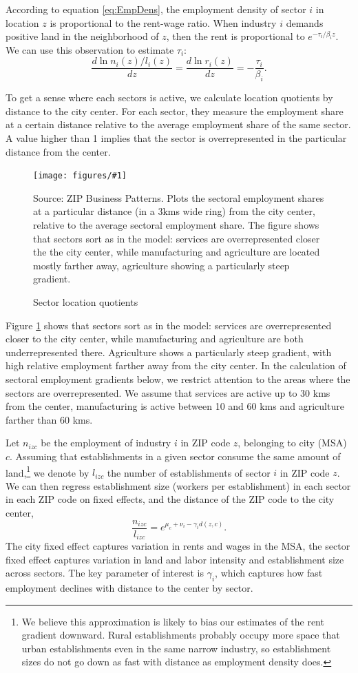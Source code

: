 \documentclass[12pt]{article}
\newcommand{\dofigure}[3]{\begin{figure}
\begin{centering}
\texttt{[image: figures/\#1]}
  \caption{#2\label{fig:#1}}
\end{centering}

\noindent \footnotesize{#3}
\end{figure}}
\begin{document}
According to equation \ref{eq:EmpDens}, the employment density of sector $i$ in location $z$ is proportional to the rent-wage ratio. When industry $i$ demands positive land in the neighborhood of $z$, then the rent is proportional to $e^{-\tau_i/\beta_i z}$. We can use this observation to estimate $\tau_i$:
\[
\frac{d\ln n_i(z)/l_i(z)}{dz} =\frac{d\ln r_i(z)}{dz} = -\frac{\tau_i}{\beta_i}.
\]

To get a sense where each sectors is active, we calculate location quotients by distance to the city center. For each sector, they measure the employment share at a certain distance relative to the average employment share of the same sector. A value higher than 1 implies that the sector is overrepresented in the particular distance from the center.

\dofigure{sector_location_quotients}{Sector location quotients}{Source: ZIP Business Patterns. Plots the sectoral employment shares at a particular distance (in a 3kms wide ring) from the city center, relative to the average sectoral employment share. The figure shows that sectors sort as in the model: services are overrepresented closer the the city center, while manufacturing and agriculture are located mostly farther away, agriculture showing a particularly steep gradient.}

Figure \ref{fig:sector_location_quotients} shows that sectors sort as in the model: services are overrepresented closer to the city center, while manufacturing and agriculture are both underrepresented there. Agriculture shows a particularly steep gradient, with high relative employment farther away from the city center. In the calculation of sectoral employment gradients below, we restrict attention to the areas where the sectors are overrepresented. We assume that services are active up to 30 kms from the center, manufacturing is active between 10 and 60 kms and agriculture farther than 60 kms.

Let $n_{izc}$ be the employment of industry $i$ in ZIP code $z$, belonging to city (MSA) $c$.  Assuming that establishments in a given sector consume the same amount of land,\footnote{We believe this approximation is likely to bias our estimates of the rent gradient downward. Rural establishments probably occupy more space that urban establishments even in the same narrow industry, so establishment sizes do not go down as fast with distance as employment density does. } we denote by $l_{izc}$ the number of establishments of sector $i$ in ZIP code $z$. We can then regress establishment size (workers per establishment) in each sector in each ZIP code on fixed effects, and the distance of the ZIP code to the city center,
\begin{equation}\label{eq:estimable:gradient}
\frac{n_{izc}}{l_{izc}} = e^{\mu_c+\nu_i-\gamma_i d(z,c)}.
\end{equation}
The city fixed effect captures variation in rents and wages in the MSA, the sector fixed effect captures variation in land and labor intensity and establishment size across sectors. %
The key parameter of interest is $\gamma_i$, which captures how fast employment declines with distance to the center by sector.
\end{document}
